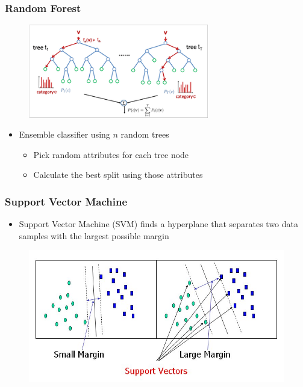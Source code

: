 \documentclass{beamer}
\begin{document}
\frame
{
    \frametitle{Random Forest}

    \begin{figure}
        \centering
        \includegraphics[width=0.7\textwidth]{random_forest_new2.png}
    \end{figure}

    \begin{itemize}
        \item Ensemble classifier using $n$ random trees
        \begin{itemize}
            \item Pick random attributes for each tree node
            \item Calculate the best split using those attributes
        \end{itemize}
    \end{itemize}

}

\frame
{
  \frametitle{Support Vector Machine}

  \begin{itemize}
    \item Support Vector Machine (SVM) finds a hyperplane that separates two data samples with the largest possible margin 
  \end{itemize}

\begin{figure}
	\centering
	\includegraphics[width=\textwidth]{svm_margin.jpg}
\end{figure}
}
\end{document}
